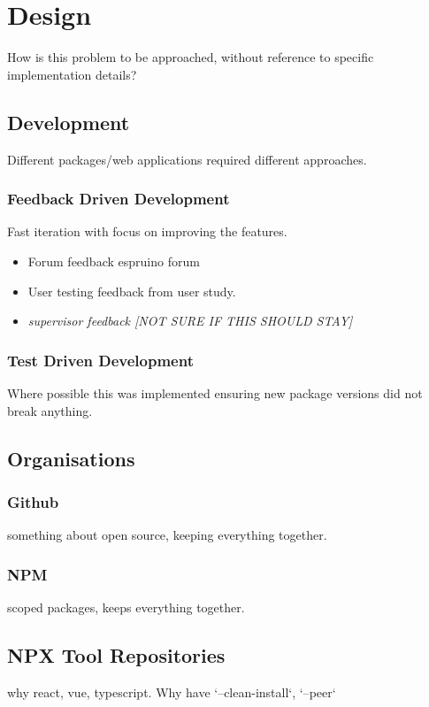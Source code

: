 \documentclass{l4proj}
\begin{document}
\chapter{Design}
How is this problem to be approached, without reference to specific implementation details? 

\section{Development}

Different packages/web applications required different approaches.

\subsection{Feedback Driven Development}
Fast iteration with focus on improving the features.
\begin{itemize}
    \item Forum feedback espruino forum
    
    \item User testing feedback from user study.
    \item \textit{supervisor feedback [NOT SURE IF THIS SHOULD STAY]}
\end{itemize}

\subsection{Test Driven Development}
Where possible this was implemented ensuring new package versions did not break anything.

\section{Organisations}
\subsection{Github}
\text something about open source, keeping everything together.
\subsection{NPM}
\text scoped packages, keeps everything together.
\section{NPX Tool Repositories}
\text why react, vue, typescript. Why have `--clean-install`, `--peer`
\end{document}
